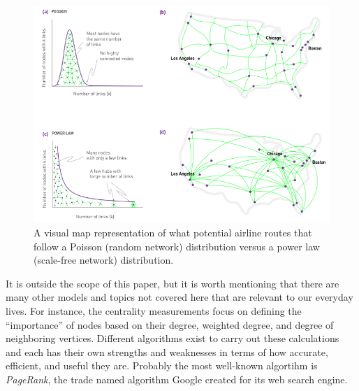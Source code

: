 \documentclass{article}
\begin{document}
\begin{figure}
    \center
    \includegraphics[scale=0.85]{ns-airportmap}
    \caption{A visual map representation of what potential airline routes that follow a Poisson (random network) distribution versus a power law (scale-free network) distribution. \cite{ns}}
    \label{fig:airline}
\end{figure}

It is outside the scope of this paper, but it is worth mentioning that there are many other models and topics not covered here that are relevant to our everyday lives.  For instance, the centrality measurements focus on defining the ``importance'' of nodes based on their degree, weighted degree, and degree of neighboring vertices.  Different algorithms exist to carry out these calculations and each has their own strengths and weaknesses in terms of how accurate, efficient, and useful they are.  Probably the most well-known algortihm is \textit{PageRank}, the trade named algorithm Google created for its web search engine.





\end{document}
